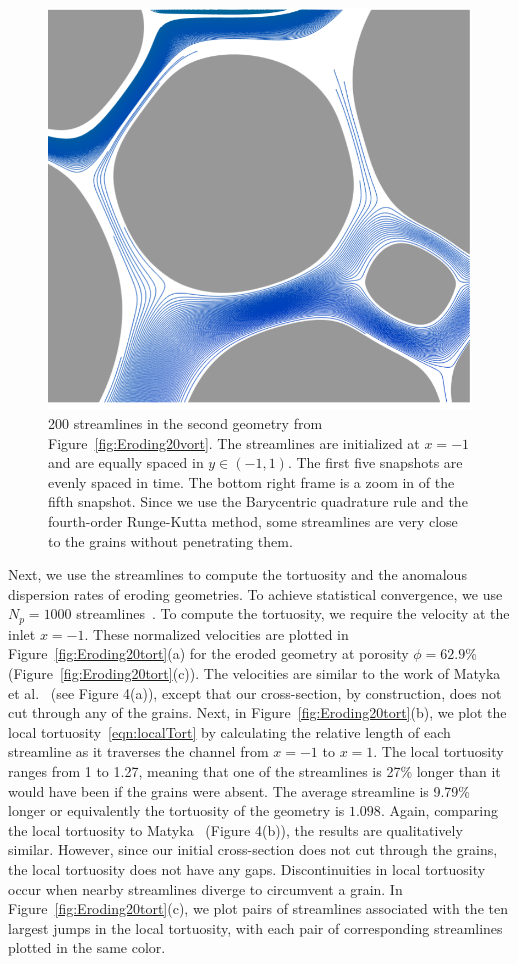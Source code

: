\documentclass[preprint,10pt]{elsarticle}
\begin{document}
\begin{figure}[H]
\begin{center}
\includegraphics[width = 0.32 \textwidth]{./figs/tracer_20b270_zoom}
\caption{\label{fig:Eroding20tracer} 200 streamlines in the second
geometry from Figure~\ref{fig:Eroding20vort}. The streamlines are
initialized at $x=-1$ and are equally spaced in $y \in (-1,1)$. The
first five snapshots are evenly spaced in time.  The bottom right frame
is a zoom in of the fifth snapshot.  Since we use the Barycentric
quadrature rule and the fourth-order Runge-Kutta method, some
streamlines are very close to the grains without penetrating them.}
\end{center}
\end{figure}

Next, we use the streamlines to compute the tortuosity and the anomalous
dispersion rates of eroding geometries.  To achieve statistical
convergence, we use $N_p = 1000$ streamlines~\cite{bel-sal-rin1992}. To
compute the tortuosity, we require the velocity at the inlet $x=-1$.
These normalized velocities are plotted in
Figure~\ref{fig:Eroding20tort}(a) for the eroded geometry at porosity
$\phi = 62.9\%$ (Figure~\ref{fig:Eroding20tort}(c)).  The velocities are
similar to the work of Matyka et al.~\cite{mat-kha-koz2008} (see Figure
4(a)), except that our cross-section, by construction, does not cut
through any of the grains.  Next, in Figure~\ref{fig:Eroding20tort}(b),
we plot the local tortuosity~\eqref{eqn:localTort} by calculating the
relative length of each streamline as it traverses the channel from
$x=-1$ to $x=1$.  The local tortuosity ranges from 1 to 1.27, meaning
that one of the streamlines is 27\% longer than it would have been if
the grains were absent.  The average streamline is 9.79\% longer or
equivalently the tortuosity of the geometry is $1.098$.  Again,
comparing the local tortuosity to Matyka~\cite{mat-kha-koz2008} (Figure
4(b)), the results are qualitatively similar. However, since our initial
cross-section does not cut through the grains, the local tortuosity does
not have any gaps.  Discontinuities in local tortuosity occur when
nearby streamlines diverge to circumvent a grain.  In
Figure~\ref{fig:Eroding20tort}(c), we plot pairs of streamlines
associated with the ten largest jumps in the local tortuosity, with each
pair of corresponding streamlines plotted in the same color.
\end{document}
